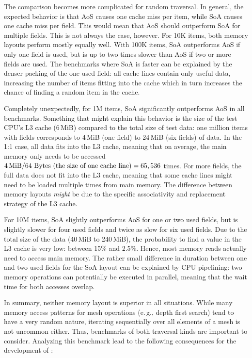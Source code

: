 The comparison becomes more complicated for random traversal.
In general, the expected behavior is that AoS causes one cache miss per item, while SoA causes one cache miss per field.
This would mean that AoS should outperform SoA for multiple fields.
This is not always the case, however.
For 10K items, both memory layouts perform mostly equally well.
With 100K items, SoA outperforms AoS if only one field is used, but is up to two times slower than AoS if two or more fields are used.
The benchmarks where SoA is faster can be explained by the denser packing of the one used field: all cache lines contain only useful data, increasing the number of items fitting into the cache which in turn increases the chance of finding a random item in the cache.

Completely unexpectedly, for 1M items, SoA significantly outperforms AoS in all benchmarks.
Something that might explain this behavior is the size of the test CPU's L3 cache (6\,MiB) compared to the total size of test data:
one million items with  fields corresponds to 4\,MiB (one field) to 24\,MiB (six fields) of data.
In the \textsf{1:1} case, all data fits into the L3 cache, meaning that on average, the main memory only needs to be accessed $4 \text{\,MiB} / 64 \text{ Bytes (the size of one cache line)} = 65,536$ times.
For more fields, the full data does not fit into the L3 cache, meaning that some cache lines might need to be loaded multiple times from main memory.
The difference between memory layouts \emph{might} be due to the specific associativity and replacement strategy of the L3 cache.

For 10M items, SoA slightly outperforms AoS for one or two used fields, but is slightly slower for four used fields and twice as slow for six used fields.
Due to the total size of the data (40\,MiB to 240\,MiB), the probability to find a value in the L3 cache is very low: between 15\% and 2.5\%.
Hence, most memory reads actually need to access main memory.
The rather small difference in duration between one and two used fields for the SoA layout can be explained by CPU pipelining: two memory operations can potentially be executed in parallel, meaning that the wait time for both accesses overlap.

\vspace{1.5cm}

In summary, neither memory layout is superior in all situations.
While many memory access patterns for mesh operations (e.\,g., depth first search) tend to have a very random nature, iterating sequentially over all elements of a mesh is not uncommon either.
Thus, benchmarks of both traversal kinds are important to consider.
Analyzing this benchmark lead to the following consequences for the development of :

